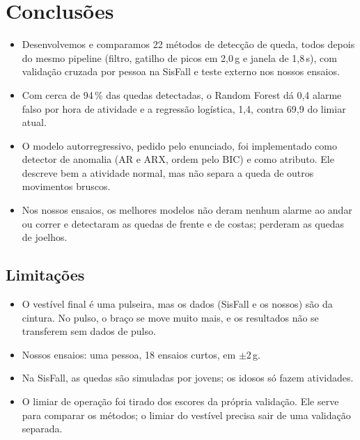 \documentclass[12pt,a4paper]{article}
\begin{document}
\section{Conclusões}\label{sec:conclusoes}
\begin{itemize}[leftmargin=1.5em]
\item Desenvolvemos e comparamos 22 métodos de detecção de queda, todos depois do mesmo
  pipeline (filtro, gatilho de picos em 2,0\,g e janela de 1,8\,s), com validação
  cruzada por pessoa na SisFall e teste externo nos nossos ensaios.
\item Com cerca de 94\,\% das quedas detectadas, o Random Forest dá 0,4 alarme falso por
  hora de atividade e a regressão logística, 1,4, contra 69,9 do limiar atual.
\item O modelo autorregressivo, pedido pelo enunciado, foi implementado como detector
  de anomalia (AR e ARX, ordem pelo BIC) e como atributo. Ele descreve bem a atividade
  normal, mas não separa a queda de outros movimentos bruscos.
\item Nos nossos ensaios, os melhores modelos não deram nenhum alarme ao andar ou correr
  e detectaram as quedas de frente e de costas; perderam as quedas de joelhos.
\end{itemize}

\subsection{Limitações}
\begin{itemize}[leftmargin=1.5em]
\item O vestível final é uma pulseira, mas os dados (SisFall e os nossos) são da
  cintura. No pulso, o braço se move muito mais, e os resultados não se transferem sem
  dados de pulso.
\item Nossos ensaios: uma pessoa, 18 ensaios curtos, em $\pm$2\,g.
\item Na SisFall, as quedas são simuladas por jovens; os idosos só fazem atividades.
\item O limiar de operação foi tirado dos escores da própria validação. Ele serve para
  comparar os métodos; o limiar do vestível precisa sair de uma validação separada.
\end{itemize}
\end{document}
